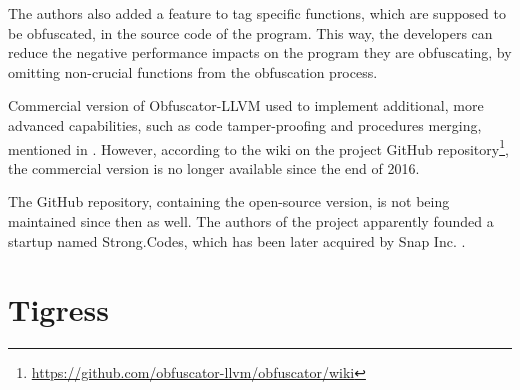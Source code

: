 \documentclass[
  digital, %
  notable,   %
  twoside, %
  nolof,     %
  nolot,     %
]{fithesis3}
\theoremstyle{definition}
\begin{document}
The authors also added a feature to tag specific functions, which are supposed to be obfuscated, in the source code of the program. This way, the developers can reduce the negative performance impacts on the program they are obfuscating, by omitting non-crucial functions from the obfuscation process. 

Commercial version of Obfuscator-LLVM used to implement additional, more advanced capabilities, such as code tamper-proofing and procedures merging, mentioned in \cite{obfuscator-llvm}. However, according to the wiki on the project GitHub repository\footnote{\url{https://github.com/obfuscator-llvm/obfuscator/wiki}}, the commercial version is no longer available since the end of 2016. 

The GitHub repository, containing the open-source version, is not being maintained since then as well. The authors of the project apparently founded a startup named Strong.Codes, which has been later acquired by Snap Inc. \cite{strong_codes}.

\section{Tigress}
\end{document}
